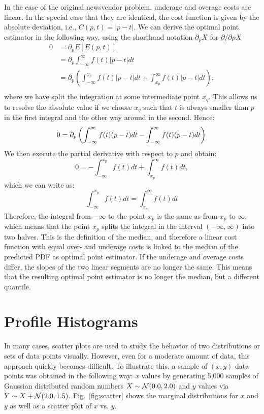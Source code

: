 \documentclass[BCOR=1mm, DIV=calc,10pt,
twoside=true,
twocolumn,
headings=normal]{scrartcl}
\newcommand{\fig}{Fig.~}
\begin{document}
In the case of the original newsvendor problem, underage and overage costs are linear. In the special case that they are identical, the cost function is given by the absolute deviation, i.e., $C(p,t) = |p-t|$.
We can derive the optimal point estimator in the following way, using the shorthand notation $\partial_p X$ for $\partial/\partial p X$
\begin{align*}
0 &= \partial_p E[E(p,t)]  \\
&= \partial_p \int_{-\infty}^\infty f(t) |p-t| dt \\
&= \partial_p \left ( \int_{-\infty}^{x_p} f(t) |p-t| dt +  \int_{x_p}^\infty f(t) |p-t| dt \right ), \\
\end{align*}
where we have split the integration at some intermediate point $x_q$. This allows us to resolve the absolute value if we choose $x_q$ such that $t$ is always smaller than $p$ in the first integral and the other way around in the second. Hence:
\begin{equation}
0 = \partial_p \left ( \int_{-\infty}^\infty f(t) (p-t) dt -  \int_{-\infty}^\infty f(t) (p-t) dt \right ) \\
\end{equation}
We then execute the partial derivative with respect to $p$ and obtain:
\begin{equation}
0 = -  \int_{-\infty}^{x_p} f(t) dt + \int_{x_p}^\infty f(t)  dt,
\end{equation}
which we can write as:
\begin{equation}
 \int_{-\infty}^{x_p} f(t) dt = \int_{x_p}^\infty f(t)  dt
\end{equation}
Therefore, the integral from $-\infty$ to the point $x_p$ is the same as from $x_p$ to $\infty$, which means that the point $x_p$ splits the integral in the interval $(-\infty, \infty)$ into two halves. This is the definition of the median, and therefore a linear cost function with equal over- and underage costs is linked to the median of the predicted PDF as optimal point estimator. If the underage and overage costs differ, the slopes of the two linear segments are no longer the same. This means that the resulting optimal point estimator is no longer the median, but a different quantile. 

\section{Profile Histograms}
\label{sec:profile}

In many cases, scatter plots are used to study the behavior of two distributions or sets of data points visually. However, even for a moderate amount of data, this approach quickly becomes difficult. To illustrate this, a sample of $(x,y)$ data points was obtained in the following way: $x$ values by generating 5,000 samples of Gaussian distributed random numbers $X \sim {\cal N}(0.0,2.0)$ and $y$ values via $Y \sim X +  {\cal N}(2.0,1.5)$. \fig \ref{fig:scatter} shows the marginal distributions for $x$ and $y$ as well as a scatter plot of $x$ vs. $y$.
\end{document}

